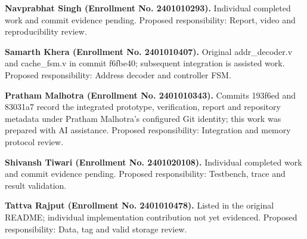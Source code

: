 \noindent\textbf{Navprabhat Singh (Enrollment No. 2401010293).} Individual completed work and commit evidence pending. Proposed responsibility: Report, video and reproducibility review.

\noindent\textbf{Samarth Khera (Enrollment No. 2401010407).} Original addr\_decoder.v and cache\_fsm.v in commit f6fbe40; subsequent integration is assisted work. Proposed responsibility: Address decoder and controller FSM.

\noindent\textbf{Pratham Malhotra (Enrollment No. 2401010343).} Commits 193f6ed and 83031a7 record the integrated prototype, verification, report and repository metadata under Pratham Malhotra's configured Git identity; this work was prepared with AI assistance. Proposed responsibility: Integration and memory protocol review.

\noindent\textbf{Shivansh Tiwari (Enrollment No. 2401020108).} Individual completed work and commit evidence pending. Proposed responsibility: Testbench, trace and result validation.

\noindent\textbf{Tattva Rajput (Enrollment No. 2401010478).} Listed in the original README; individual implementation contribution not yet evidenced. Proposed responsibility: Data, tag and valid storage review.
